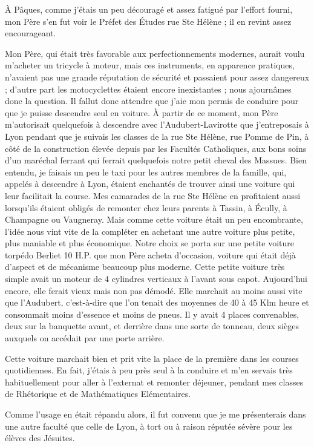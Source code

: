 \documentclass[11pt,a4paper]{report}
\begin{document}
À Pâques, comme j'étais un peu découragé et assez fatigué par l'effort fourni, mon Père s'en fut voir le Préfet des Études rue Ste Hélène ; il en revint assez encourageant.

Mon Père, qui était très favorable aux perfectionnements modernes, aurait voulu m'acheter un tricycle à moteur, mais ces instruments, en apparence pratiques, n'avaient pas une grande réputation de sécurité et passaient pour assez dangereux ; d'autre part les motocyclettes étaient encore inexistantes ; nous ajournâmes donc la question. Il fallut donc attendre que j'aie mon permis de conduire pour que je puisse descendre seul en voiture. À partir de ce moment, mon Père m'autorisait quelquefois à descendre avec l'Audubert-Lavirotte que j'entreposais à Lyon pendant que je suivais les classes de la rue Ste Hélène, rue Pomme de Pin, à côté de la construction élevée depuis par les Facultés Catholiques, aux bons soins d'un maréchal ferrant qui ferrait quelquefois notre petit cheval des Massues. Bien entendu, je faisais un peu le taxi pour les autres membres de la famille, qui, appelés à descendre à Lyon, étaient enchantés de trouver ainsi une voiture qui leur facilitait la course. Mes camarades de la rue Ste Hélène en profitaient aussi lorsqu'ils étaient obligés de remonter chez leurs parents à Tassin, à Écully, à Champagne ou Vaugneray. Mais comme cette voiture était un peu encombrante, l'idée nous vint vite de la compléter en achetant une autre voiture plus petite, plus maniable et plus économique. Notre choix se porta sur une petite voiture torpédo Berliet 10 H.P. que mon Père acheta d'occasion, voiture qui était déjà d'aspect et de mécanisme beaucoup plus moderne. Cette petite voiture très simple avait un moteur de 4 cylindres verticaux à l'avant sous capot. Aujourd'hui encore, elle ferait vieux mais non pas démodé. Elle marchait au moins aussi vite que l'Audubert, c'est-à-dire que l'on tenait des moyennes de 40 à 45 Klm heure et consommait moins d'essence et moins de pneus. Il y avait 4 places convenables, deux sur la banquette avant, et derrière dans une sorte de tonneau, deux sièges auxquels on accédait par une porte arrière.

Cette voiture marchait bien et prit vite la place de la première dans les courses quotidiennes. En fait, j'étais à peu près seul à la conduire et m'en servais très habituellement pour aller à l'externat et remonter déjeuner, pendant mes classes de Rhétorique et de Mathématiques Elémentaires.

Comme l'usage en était répandu alors, il fut convenu que je me présenterais dans une autre faculté que celle de Lyon, à tort ou à raison réputée sévère pour les élèves des Jésuites.
\end{document}
